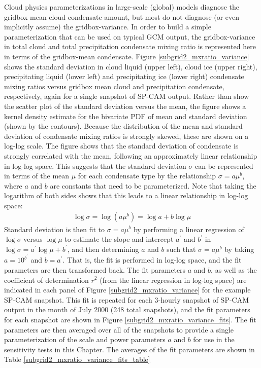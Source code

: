 Cloud physics parameterizations in large-scale (global) models diagnose the gridbox-mean cloud condensate amount, but most do not diagnose (or even implicitly assume) the gridbox-variance. In order to build a simple parameterization that can be used on typical GCM output, the gridbox-variance in total cloud and total precipitation condensate mixing ratio is represented here in terms of the gridbox-mean condensate. Figure \ref{subgrid2_mxratio_variance} shows the standard deviation in cloud liquid (upper left), cloud ice (upper right), precipitating liquid (lower left) and precipitating ice (lower right) condensate mixing ratios versus gridbox mean cloud and precipitation condensate, respectively, again for a single snapshot of SP-CAM output. Rather than show the scatter plot of the standard deviation versus the mean, the figure shows a kernel density estimate for the bivariate PDF of mean and standard deviation (shown by the contours). Because the distribution of the mean and standard deviation of condensate mixing ratios is strongly skewed, these are shown on a log-log scale. The figure shows that the standard deviation of condensate is strongly correlated with the mean, following an approximately linear relationship in log-log space. This suggests that the standard deviation $\sigma$ can be represented in terms of the mean $\mu$ for each condensate type by the relationship $\sigma = a \mu^b$, where $a$ and $b$ are constants that need to be parameterized. Note that taking the logarithm of both sides shows that this leads to a linear relationship in log-log space:
\begin{gather}
    \log \sigma = \log(a \mu^b) = \log a + b\log \mu
\end{gather}
Standard deviation is then fit to $\sigma = a \mu^b$ by performing a linear regression of $\log\sigma$ versus $\log \mu$ to estimate the slope and intercept $a^{\prime}$ and $b^{\prime}$ in $\log \sigma = a^{\prime} \log \mu + b^{\prime}$, and then determining $a$ and $b$ such that $\sigma = a \mu^b$ by taking $a = 10^{b^{\prime}}$ and $b = a^{\prime}$. That is, the fit is performed in log-log space, and the fit parameters are then transformed back. The fit parameters $a$ and $b$, as well as the coefficient of determination $r^2$ (from the linear regression in log-log space) are indicated in each panel of Figure \ref{subgrid2_mxratio_variance} for the example SP-CAM snapshot. This fit is repeated for each 3-hourly snapshot of SP-CAM output in the month of July 2000 (248 total snapshots), and the fit parameters for each snapshot are shown in Figure \ref{subgrid2_mxratio_variance_fits}. The fit parameters are then averaged over all of the snapshots to provide a single parameterization of the scale and power parameters $a$ and $b$ for use in the sensitivity tests in this Chapter. The averages of the fit parameters are shown in Table \ref{subgrid2_mxratio_variance_fits_table}

